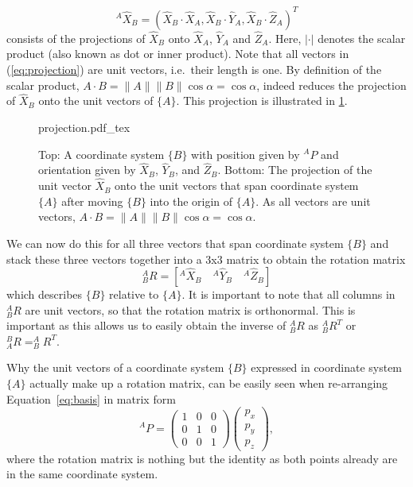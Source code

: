 \begin{equation}\label{eq:projection}
^A\hat{X}_B=(\hat{X}_B\cdot\hat{X}_A, \hat{X}_B\cdot\hat{Y}_A,\hat{X}_B\cdot\hat{Z}_A)^T
\end{equation}
consists of the projections of $\hat{X}_B$ onto $\hat{X}_A$, $\hat{Y}_A$ and $\hat{Z}_A$. Here,  $|\cdot|$ denotes the scalar product (also known as dot or inner product).  Note that all vectors in (\ref{eq:projection}) are unit vectors, i.e.\ their length is one. By definition of the scalar product, $A\cdot B=\|A\|\|B\|\cos \alpha=\cos \alpha$, indeed reduces the projection of $\hat{X}_B$ onto the unit vectors of $\{A\}$. This projection is illustrated in \cref{fig:projection}.

\begin{figure}
    \centering
    \def\svgwidth{0.8\textwidth}
    {projection.pdf_tex}
    \caption{Top: A coordinate system $\{B\}$ with position given by $^AP$ and orientation given by $\hat{X}_B$, $\hat{Y}_B$, and $\hat{Z}_B$. Bottom:
    The projection of the unit vector $\hat{X}_B$ onto the unit vectors that span coordinate system $\{A\}$ after moving $\{B\}$ into the origin of $\{A\}$. As all vectors are unit vectors, $A\cdot B=\|A\|\|B\|\cos \alpha=\cos \alpha$. }
    \label{fig:projection}
\end{figure}


We can now do this for all three vectors that span coordinate system $\{B\}$ and stack these three vectors together into a 3x3 matrix to obtain the rotation matrix
%
\begin{equation}
^A_BR=[^A\hat{X}_B \quad ^A\hat{Y}_B \quad ^A\hat{Z}_B]
\end{equation}
%
which describes $\{B\}$ relative to $\{A\}$. It is important to note that all columns in $ ^A_BR$ are unit vectors, so that the rotation matrix is orthonormal. This is important as this allows us to easily obtain the inverse of $ ^A_BR$ as $ ^A_BR^T$ or
$ ^B_AR=^A_BR^T$.

Why the unit vectors of a coordinate system $\{B\}$ expressed in coordinate system $\{A\}$ actually make up a rotation matrix, can be easily seen when re-arranging Equation~\ref{eq:basis} in matrix form
\begin{equation}
^AP=\left(\begin{array}{ccc}1 & 0 & 0\\0 & 1 & 0\\0 & 0 & 1\end{array}\right)\left(\begin{array}{c}p_x\\p_y\\p_z\end{array}\right),
\end{equation}
where the rotation matrix is nothing but the identity as both points already are in the same coordinate system.

